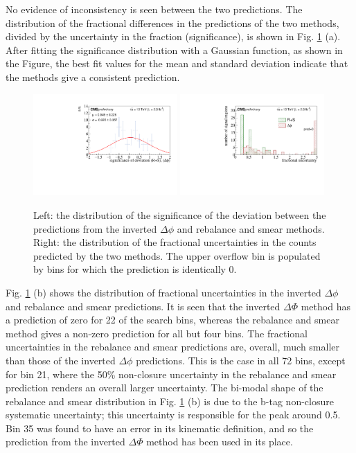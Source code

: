 No evidence of inconsistency is seen between the two predictions. The distribution of the fractional differences in the predictions of the two methods, divided by the uncertainty in the fraction (significance), is shown in Fig. \ref{fig:fractionalUnc} (a). After fitting the significance distribution  with a Gaussian function, as shown in the Figure, the best fit values for the mean and standard deviation indicate that the methods give a consistent prediction.
\begin{figure}[tb!]
\centering
\includegraphics[width=0.49\textwidth]{figures/SusySearches/Ra2b2015/FractionalUncertainty.pdf}
\includegraphics[width=0.49\textwidth]{figures/SusySearches/Ra2b2015/FracUnc.pdf}
\caption{Left: the distribution of the significance of the deviation between the predictions from the inverted $\Delta\phi$ and rebalance and smear methods. Right: the distribution of the fractional uncertainties in the counts predicted by the two methods. The upper overflow bin is populated by bins for which the prediction is identically 0. }
\label{fig:fractionalUnc}
\end{figure}
Fig. \ref{fig:fractionalUnc} (b) shows the distribution of fractional uncertainties in the inverted $\Delta\phi$ and rebalance and smear predictions. It is seen that the inverted $\Delta\Phi$ method has a prediction of zero for 22 of the search bins, whereas the rebalance and smear method gives a non-zero prediction for all but four bins. The fractional uncertainties in the rebalance and smear predictions are, overall, much smaller than those of the inverted $\Delta\phi$ predictions. This is the case in all 72 bins, except for bin 21, where the 50\% non-closure uncertainty in the rebalance and smear prediction renders an overall larger uncertainty. The bi-modal shape of the rebalance and smear distribution in Fig. \ref{fig:fractionalUnc} (b) is due to the b-tag non-closure systematic uncertainty; this uncertainty is responsible for the peak around 0.5.  Bin 35 was found to have an error in its kinematic definition, and so the prediction from the inverted $\Delta\Phi$ method has been used in its place.



